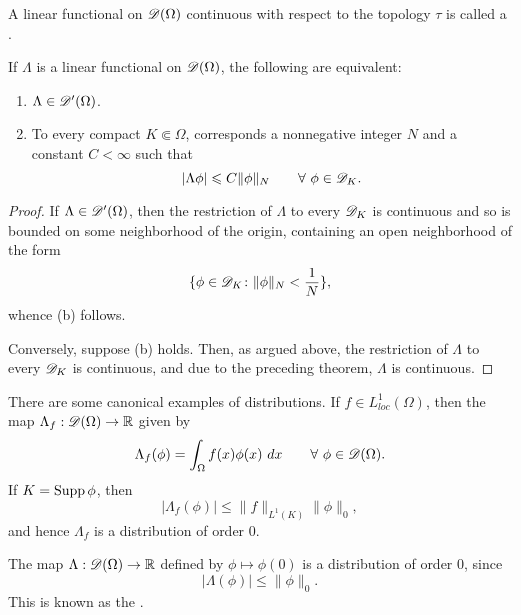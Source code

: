\begin{definition}
    A linear functional on $\mathscr{D}(\Omega)$ continuous with respect to the topology $\tau$ is called a .
\end{definition}

\begin{theorem}
    If $\Lambda$ is a linear functional on $\mathscr{D}(\Omega)$, the following are equivalent: 
    \begin{enumerate}[label=(\alph*)]
        \item $\Lambda\in\mathscr{D}'(\Omega)$. 
        \item To every compact $K\Subset\Omega$, corresponds a nonnegative integer $N$ and a constant $C < \infty$ such that
        \begin{equation*}
            |\Lambda\phi|\leqslant C\|\phi\|_N\qquad\forall~\phi\in\mathscr{D}_K.
        \end{equation*}
    \end{enumerate}
\end{theorem}
\begin{proof}
    If $\Lambda\in\mathscr{D}'(\Omega)$, then the restriction of $\Lambda$ to every $\mathscr{D}_K$ is continuous and so is bounded on some neighborhood of the origin, containing an open neighborhood of the form 
    \begin{equation*}
        \{\phi\in\mathscr{D}_K\colon \|\phi\|_N < \frac{1}{N}\},
    \end{equation*}
    whence (b) follows.

    Conversely, suppose (b) holds. Then, as argued above, the restriction of $\Lambda$ to every $\mathscr{D}_K$ is continuous, and due to the preceding theorem, $\Lambda$ is continuous.
\end{proof}

\begin{example}
There are some canonical examples of distributions. If $f\in L^1_{loc}(\Omega)$, then the map $\Lambda_f: \mathscr{D}(\Omega)\to\mathbb{R}$ given by 
\begin{equation*}
    \Lambda_f(\phi) = \int_\Omega f(x)\phi(x)~dx\qquad\forall~\phi\in\mathscr{D}(\Omega).
\end{equation*}
If $K = \operatorname{Supp}\phi$, then 
\begin{equation*}
    |\Lambda_f(\phi)|\le\|f\|_{L^1(K)}\|\phi\|_0,
\end{equation*}
and hence $\Lambda_f$ is a distribution of order $0$.
\end{example}

\begin{example}
    The map $\Lambda:\mathscr{D}(\Omega)\to\mathbb{R}$ defined by $\phi\mapsto\phi(0)$ is a distribution of order $0$, since 
    \begin{equation*}
        |\Lambda(\phi)|\le\|\phi\|_0.
    \end{equation*}
    This is known as the .
\end{example}

